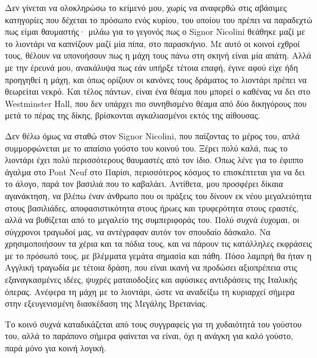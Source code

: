 Δεν γίνεται να ολοκληρώσω το κείμενό μου, χωρίς να αναφερθώ στις αβάσιμες κατηγορίες που δέχεται το πρόσωπο ενός κυρίου, του οποίου του πρέπει να παραδεχτώ πως είμαι θαυμαστής· μιλάω για το γεγονός πως ο Signor Nicolini θεάθηκε μαζί με το λιοντάρι να καπνίζουν μαζί μία πίπα, στο παρασκήνιο. Με αυτό οι κοινοί εχθροί τους, θέλουν να υπονοήσουν πως η μάχη τους πάνω στη σκηνή είναι μία απάτη. Αλλά με την έρευνά μου, ανακάλυψα πως εάν υπήρξε τέτοια επαφή, έγινε αφού είχε ήδη προηγηθεί η μάχη, και όπως ορίζουν οι κανόνες τους δράματος το λιοντάρι πρέπει να θεωρείται νεκρό. Και τέλος πάντων, είναι ένα θέαμα που μπορεί ο καθένας να δει στο Westminster Hall, που δεν υπάρχει πιο συνηθισμένο θέαμα από δύο δικηγόρους που μετά το πέρας της δίκης, βρίσκονται αγκαλιασμένοι εκτός της αίθουσας.

Δεν θέλω όμως να σταθώ στον Signor Nicolini, που παίζοντας το μέρος του, απλά συμμορφώνεται με το απαίσιο γούστο του κοινού του. Ξέρει πολύ καλά, πως το λιοντάρι έχει πολύ περισσότερους θαυμαστές από τον ίδιο. Όπως λένε για το έφιππο άγαλμα στο Pont Neuf στο Παρίσι, περισσότερος κόσμος το επισκέπτεται για να δει το άλογο, παρά τον βασιλιά που το καβαλάει. Αντίθετα, μου προσφέρει δίκαια αγανάκτηση, να βλέπω έναν άνθρωπο που οι πράξεις του δίνουν εκ νέου μεγαλειότητα στους βασιλιάδες, αποφασιστικότητα στους ήρωες και τρυφερότητα στους εραστές, αλλά να βυθίζεται από το μεγαλείο της συμπεριφοράς του. Πολύ συχνά έυχομαι, οι σύγχρονοι τραγωδοί μας, να αντέγραφαν αυτόν τον σπουδαίο δάσκαλο. Να χρησιμοποιήσουν τα χέρια και τα πόδια τους, και να πάρουν τις κατάλληλες εκφράσεις με το πρόσωπό τους, με βλέμματα γεμάτα σημασία και πάθη. Πόσο λαμπρή θα ήταν η Αγγλική τραγωδία με τέτοια δράση, που είναι ικανή να προδώσει αξιοπρέπεια στις εξαναγκασμένες ιδέες, ψυχρές ματαιοδοξίες και αφύσικες αντιδράσεις της Ιταλικής όπερας. Ανέφερα τη μάχη με το λιοντάρι, ώστε να αναδείξω τη κυριαρχεί σήμερα στην εξευγενισμένη διασκέδαση της Μεγάλης Βρετανίας.

Το κοινό συχνά καταδικάζεται από τους συγγραφείς για τη χυδαιότητά του γούστου του, αλλά το παράπονο σήμερα φαίνεται να είναι, όχι η ανάγκη για καλό γούστο, παρά μόνο για κοινή λογική.